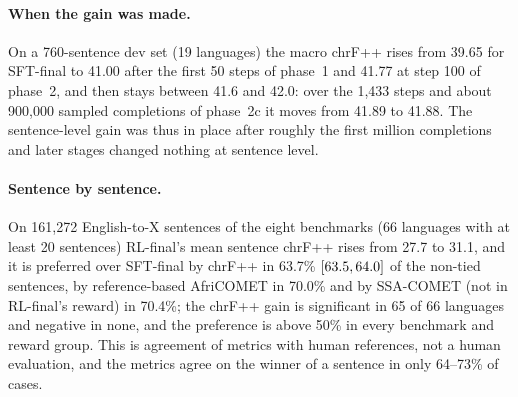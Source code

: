 \paragraph{When the gain was made.} On a 760-sentence dev set (19 languages) the macro chrF++ rises from 39.65 for SFT-final to 41.00 after the first 50 steps of phase~1 and 41.77 at step 100 of phase~2, and then stays between 41.6 and 42.0: over the 1,433 steps and about 900,000 sampled completions of phase~2c it moves from 41.89 to 41.88. The sentence-level gain was thus in place after roughly the first million completions and later stages changed nothing at sentence level.

\paragraph{Sentence by sentence.} On 161,272 English-to-X sentences of the eight benchmarks (66 languages with at least 20 \nopair{} sentences) RL-final's mean sentence chrF++ rises from 27.7 to 31.1, and it is preferred over SFT-final by chrF++ in 63.7\% $[63.5, 64.0]$ of the non-tied sentences, by reference-based AfriCOMET in 70.0\% and by SSA-COMET (not in RL-final's reward) in 70.4\%; the chrF++ gain is significant in 65 of 66 languages and negative in none, and the preference is above 50\% in every benchmark and reward group. This is agreement of metrics with human references, not a human evaluation, and the metrics agree on the winner of a sentence in only 64--73\% of cases.

